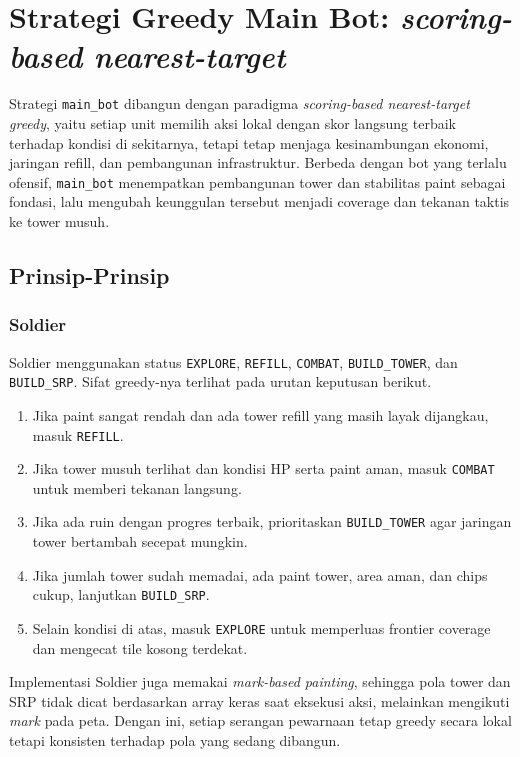 \section{Strategi Greedy Main Bot: \textit{scoring-based nearest-target}}

Strategi \texttt{main\_bot} dibangun dengan paradigma \textit{scoring-based nearest-target greedy}, yaitu setiap unit memilih aksi lokal dengan skor langsung terbaik terhadap kondisi di sekitarnya, tetapi tetap menjaga kesinambungan ekonomi, jaringan refill, dan pembangunan infrastruktur. Berbeda dengan bot yang terlalu ofensif, \texttt{main\_bot} menempatkan pembangunan tower dan stabilitas paint sebagai fondasi, lalu mengubah keunggulan tersebut menjadi coverage dan tekanan taktis ke tower musuh.

\subsection{Prinsip-Prinsip}    

\subsubsection{Soldier}

Soldier menggunakan status \texttt{EXPLORE}, \texttt{REFILL}, \texttt{COMBAT}, \texttt{BUILD\_TOWER}, dan \texttt{BUILD\_SRP}. Sifat greedy-nya terlihat pada urutan keputusan berikut.

\begin{enumerate}
    \item Jika paint sangat rendah dan ada tower refill yang masih layak dijangkau, masuk \texttt{REFILL}.
    \item Jika tower musuh terlihat dan kondisi HP serta paint aman, masuk \texttt{COMBAT} untuk memberi tekanan langsung.
    \item Jika ada ruin dengan progres terbaik, prioritaskan \texttt{BUILD\_TOWER} agar jaringan tower bertambah secepat mungkin.
    \item Jika jumlah tower sudah memadai, ada paint tower, area aman, dan chips cukup, lanjutkan \texttt{BUILD\_SRP}.
    \item Selain kondisi di atas, masuk \texttt{EXPLORE} untuk memperluas frontier coverage dan mengecat tile kosong terdekat.
\end{enumerate}

Implementasi Soldier juga memakai \textit{mark-based painting}, sehingga pola tower dan SRP tidak dicat berdasarkan array keras saat eksekusi aksi, melainkan mengikuti \textit{mark} pada peta. Dengan ini, setiap serangan pewarnaan tetap greedy secara lokal tetapi konsisten terhadap pola yang sedang dibangun.

